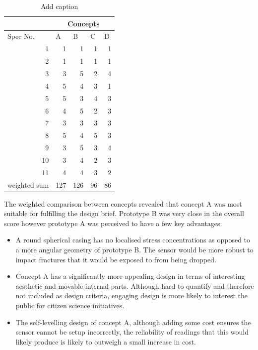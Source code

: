 \begin{table}[htbp]
  \centering
  \caption{Add caption}
    \begin{tabular}{lrrrr}
          & \multicolumn{4}{c}{Concepts} \\
\hline
    Spec No. & \multicolumn{1}{l}{A} & \multicolumn{1}{l}{B} & \multicolumn{1}{l}{C} & \multicolumn{1}{l}{D} \\
\hline
    \multicolumn{1}{r}{1} & 1     & 1     & 1     & 1 \\
    \multicolumn{1}{r}{2} & 1     & 1     & 1     & 1 \\
    \multicolumn{1}{r}{3} & 3     & 5     & 2     & 4 \\
    \multicolumn{1}{r}{4} & 5     & 4     & 3     & 1 \\
    \multicolumn{1}{r}{5} & 5     & 3     & 4     & 3 \\
    \multicolumn{1}{r}{6} & 4     & 5     & 2     & 3 \\
    \multicolumn{1}{r}{7} & 3     & 3     & 3     & 3 \\
    \multicolumn{1}{r}{8} & 5     & 4     & 5     & 3 \\
    \multicolumn{1}{r}{9} & 3     & 5     & 3     & 4 \\
    \multicolumn{1}{r}{10} & 3     & 4     & 2     & 3 \\
    \multicolumn{1}{r}{11} & 4     & 4     & 3     & 2 \\
    weighted sum & \cellcolor[rgb]{ .388,  .745,  .482}127 & \cellcolor[rgb]{ .427,  .757,  .486}126 & \cellcolor[rgb]{ .98,  .616,  .459}96 & \cellcolor[rgb]{ .973,  .412,  .42}86 \\
\hline
    \end{tabular}%
  \label{tab:addlabel}%
\end{table}%

The weighted comparison between concepts revealed that concept A was most suitable for fulfilling the design brief. Prototype B was very close in the overall score however prototype A was perceived to have a few key advantages:
\begin{itemize}
\item A round spherical casing has no localised stress concentrations as opposed to a more angular geometry of prototype B. The sensor would be more robust to impact fractures that it would be exposed to from being dropped.
\item Concept A has a significantly more appealing design in terms of interesting aesthetic and movable internal parts. Although hard to quantify and therefore not included as design criteria, engaging design is more likely to interest the public for citizen science initiatives.
\item The self-levelling design of concept A, although adding some cost ensures the sensor cannot be setup incorrectly, the reliability of readings that this would likely produce is likely to outweigh a small increase in cost.
\end{itemize}

